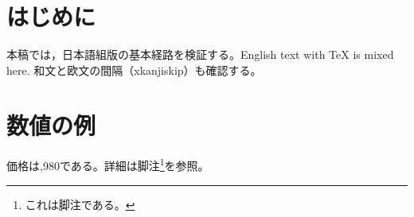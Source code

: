 \documentclass{jlreq}
\begin{document}
\section{はじめに}
本稿では，日本語組版の基本経路を検証する。English text with \TeX{} is mixed here.
和文と欧文の間隔（xkanjiskip）も確認する。

\section{数値の例}
価格は,980である。詳細は脚注\footnote{これは脚注である。}を参照。
\end{document}
